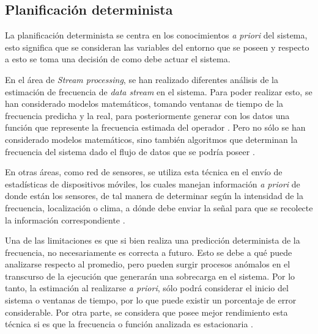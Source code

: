 \subsection{Planificación determinista}
\label{sec:planificacionBC}

La planificación determinista se centra en los conocimientos \textit{a priori} del sistema, esto significa que se consideran las variables del entorno que se poseen y respecto a esto se toma una decisión de como debe actuar el sistema. 

En el área de \textit{Stream processing}, se han realizado diferentes análisis de la estimación de frecuencia de \textit{data stream} en el sistema. Para poder realizar esto, se han considerado modelos matemáticos, tomando ventanas de tiempo de la frecuencia predicha y la real, para posteriormente generar con los datos una función que represente la frecuencia estimada del operador \citep{Ganguly09}. Pero no sólo se han considerado modelos matemáticos, sino también algoritmos que determinan la frecuencia del sistema dado el flujo de datos que se podría poseer \citep{BhuvanagiriGKS06}.

En otras áreas, como red de sensores, se utiliza esta técnica en el envío de estadísticas de dispositivos móviles, los cuales manejan información \textit{a priori} de donde están los sensores, de tal manera de determinar según la intensidad de la frecuencia, localización o clima, a dónde debe enviar la señal para que se recolecte la información correspondiente \citep{DongTS07}.

Una de las limitaciones es que si bien realiza una predicción determinista de la frecuencia, no necesariamente es correcta a futuro. Esto se debe a qué puede analizarse respecto al promedio, pero pueden surgir procesos anómalos en el transcurso de la ejecución que generarán una sobrecarga en el sistema. Por lo tanto, la estimación al realizarse \textit{a priori}, sólo podrá considerar el inicio del sistema o ventanas de tiempo, por lo que puede existir un porcentaje de error considerable. Por otra parte, se considera que posee mejor rendimiento esta técnica si es que la frecuencia o función analizada es estacionaria \citep{KarpSP03}.

